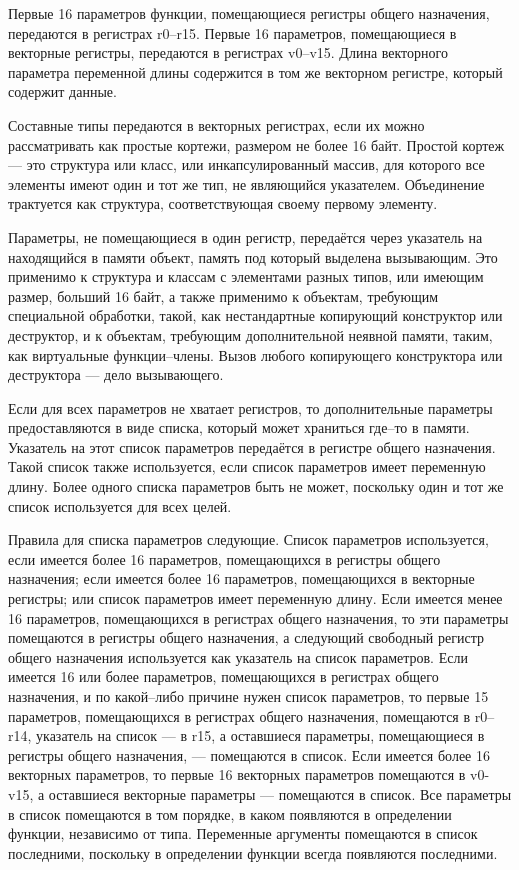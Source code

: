 \documentclass[forwardcom.tex]{subfiles}
\begin{document}
Первые 16 параметров функции, помещающиеся регистры общего назначения, передаются в регистрах r0--r15. Первые 16 параметров, помещающиеся в векторные регистры, передаются в регистрах v0--v15. Длина векторного параметра переменной длины содержится в том же векторном регистре, который содержит данные.

Составные типы передаются в векторных регистрах, если их можно рассматривать как \glqq простые кортежи\grqq, размером не более 16 байт. Простой кортеж --- это структура или класс, или инкапсулированный массив, для которого все элементы имеют один и тот же тип, не являющийся указателем. Объединение трактуется как структура, соответствующая своему первому элементу.

Параметры, не помещающиеся в один регистр, передаётся через указатель на находящийся в памяти объект, память под который выделена вызывающим. Это применимо к структура  и классам с элементами разных типов, или имеющим размер, больший 16 байт, а также применимо к объектам, требующим специальной обработки, такой, как нестандартные копирующий конструктор или деструктор, и к объектам, требующим дополнительной неявной памяти, таким, как виртуальные функции--члены. Вызов любого копирующего конструктора или деструктора --- дело вызывающего.

Если для всех параметров не хватает регистров, то дополнительные параметры предоставляются в виде списка, который может храниться где--то в памяти. Указатель на этот список параметров передаётся в регистре общего назначения. Такой список также используется, если список параметров имеет переменную длину. Более одного списка параметров быть не может, поскольку один и тот же список используется для всех целей.

Правила для списка параметров следующие. Список параметров используется, если имеется более 16 параметров, помещающихся в регистры общего назначения; если имеется более 16 параметров, помещающихся в векторные регистры; или список параметров имеет переменную длину. Если имеется менее 16  параметров, помещающихся в регистрах общего назначения, то эти параметры помещаются в регистры общего назначения, а следующий свободный регистр общего назначения используется как указатель на список параметров. Если имеется 16 или более параметров, помещающихся в регистрах общего назначения, и по какой--либо причине нужен список параметров, то первые 15 параметров, помещающихся в регистрах общего назначения, помещаются в r0--r14, указатель на список --- в r15, а оставшиеся параметры, помещающиеся в регистры общего назначения, --- помещаются в список. Если имеется более 16 векторных параметров, то первые 16 векторных параметров помещаются в v0-v15, а оставшиеся векторные параметры --- помещаются в список. Все параметры в список помещаются в том порядке, в каком появляются в определении функции, независимо от типа. Переменные аргументы помещаются в список последними, поскольку в определении функции всегда появляются последними.
\end{document}
